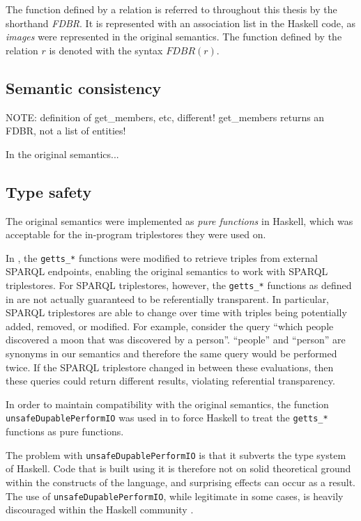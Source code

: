 \documentclass[../main.tex]{subfiles}
\begin{document}
The function defined by a relation is referred to throughout this thesis by the shorthand {\em FDBR}.  It is represented with an association list in the Haskell code,
as {\em images} were represented in the original semantics.  The function defined by the relation $r$ is denoted with the syntax $FDBR(r)$.

\subsection{Semantic consistency}

NOTE: definition of get\_members, etc, different! get\_members returns an FDBR, not a list of entities!

In the original semantics...

\subsection{Type safety}

The original semantics were implemented as {\em pure functions} in Haskell, which was acceptable for the in-program triplestores they were used on.

In \cite{agboola2015extensible}, the \texttt{getts\_*} functions were modified to retrieve triples from external SPARQL endpoints, enabling the original
semantics to work with SPARQL triplestores.  For SPARQL triplestores, however, the \texttt{getts\_*} functions as defined in \cite{agboola2015extensible} are not actually guaranteed to be referentially transparent. In particular, SPARQL triplestores are able to change over time with triples being potentially added, removed, or modified.
For example, consider the query ``which people discovered a moon that was discovered by a person''.
``people'' and ``person'' are synonyms in our semantics and therefore the same query would be performed twice.  If the SPARQL triplestore changed in between these evaluations,
then these queries could return different results, violating referential transparency.

In order to maintain compatibility with the original semantics, the function \texttt{unsafeDupablePerformIO} was used in \cite{agboola2015extensible} to force Haskell to treat the \texttt{getts\_*} functions as pure functions.

The problem with \texttt{unsafeDupablePerformIO} is that it subverts the type system of Haskell.  Code that is built using it is therefore not on
solid theoretical ground within the constructs of the language, and surprising effects can occur as a result.  The use of \texttt{unsafeDupablePerformIO}, while
legitimate in some cases, is heavily discouraged within the Haskell community \cite{noUnsafePerformIO}.
\end{document}
